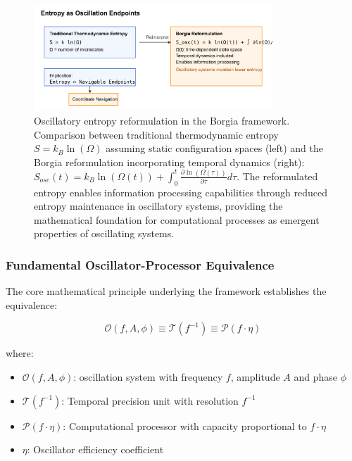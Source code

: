\documentclass[12pt,a4paper]{article}
\begin{document}
\begin{figure}[H]
    \centering
    \includegraphics[width=0.8\textwidth]{images/oscillatory_entropy_reformulation.pdf}
    \caption{Oscillatory entropy reformulation in the Borgia framework. Comparison between traditional thermodynamic entropy $S = k_B \ln(\Omega)$ assuming static configuration spaces (left) and the Borgia reformulation incorporating temporal dynamics (right): $S_{osc}(t) = k_B \ln(\Omega(t)) + \int_0^t \frac{\partial \ln(\Omega(\tau))}{\partial \tau} d\tau$. The reformulated entropy enables information processing capabilities through reduced entropy maintenance in oscillatory systems, providing the mathematical foundation for computational processes as emergent properties of oscillating systems.}
    \label{fig:oscillatory_entropy}
\end{figure}


\subsubsection{Fundamental Oscillator-Processor Equivalence}

The core mathematical principle underlying the framework establishes the equivalence:

\begin{equation}
\mathcal{O}(f, A, \phi) \equiv \mathcal{T}(f^{-1}) \equiv \mathcal{P}(f \cdot \eta)
\end{equation}

where:
\begin{itemize}
\item $\mathcal{O}(f, A, \phi)$: oscillation system with frequency $f$, amplitude $A$ and phase $\phi$
\item $\mathcal{T}(f^{-1})$: Temporal precision unit with resolution $f^{-1}$
\item $\mathcal{P}(f \cdot \eta)$: Computational processor with capacity proportional to $f \cdot \eta$
\item $\eta$: Oscillator efficiency coefficient
\end{itemize}
\end{document}

